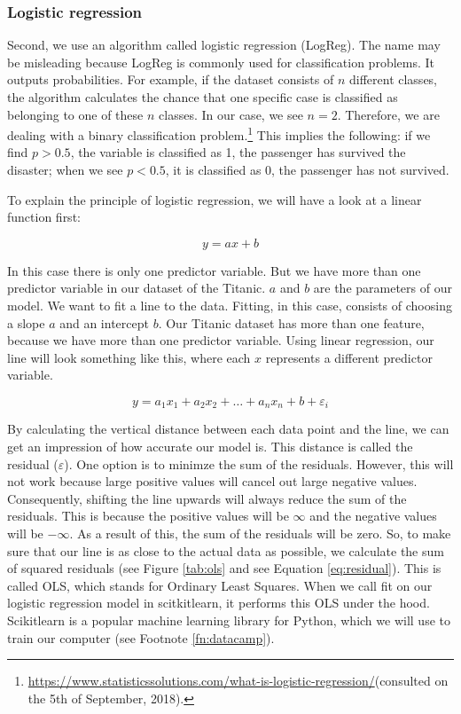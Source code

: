\documentclass[11pt]{article}
\begin{document}
\subsubsection{Logistic regression}
\label{sec:org6cf431b}
Second, we use an algorithm called logistic regression (LogReg). The name may be misleading because LogReg is commonly used for classification problems. It outputs probabilities. For example, if the dataset consists of \(n\) different classes, the algorithm calculates the chance that one specific case is classified as belonging to one of these \(n\) classes. In our case, we see \(n=2\). Therefore, we are dealing with a binary classification problem.\footnote{\url{https://www.statisticssolutions.com/what-is-logistic-regression/}(consulted on the 5th of September, 2018).} This implies the following: if we find \(p>0.5\), the variable is classified as 1, the passenger has survived the disaster; when we see \(p<0.5\), it is classified as 0, the passenger has not survived. 

To explain the principle of logistic regression, we will have a look at a linear function first:

\begin{equation}
y=ax+b
\end{equation} 

In this case there is only one predictor variable. But we have more than one predictor variable in our dataset of the Titanic. \(a\) and \(b\) are the parameters of our model. We want to fit a line to the data. Fitting, in this case, consists of choosing a slope \(a\) and an intercept \(b\). Our Titanic dataset has more than one feature, because we have more than one predictor variable. Using linear regression, our line will look something like this, where each \(x\) represents a different predictor variable. 

\begin{equation}
y=a_1x_1+a_2x_2+ \dots + a_nx_n+b+\varepsilon_{i}  
\end{equation}

By calculating the vertical distance between each data point and the line, we can get an impression of how accurate our model is. This distance is called the residual (\(\varepsilon\)). One option is to minimze the sum of the residuals. However, this will not work because large positive values will cancel out large negative values. Consequently, shifting the line upwards will always reduce the sum of the residuals. This is because the positive values will be \(\infty\) and the negative values will be \(-\infty\). As a result of this, the sum of the residuals will be zero. So, to make sure that our line is as close to the actual data as possible, we calculate the sum of squared residuals (see Figure \ref{tab:ols} and see Equation \ref{eq:residual}). This is called OLS, which stands for Ordinary Least Squares. When we call fit on our logistic regression model in scitkitlearn, it performs this OLS under the hood. Scikitlearn is a popular machine learning library for Python, which we will use to train our computer (see Footnote \ref{fn:datacamp}).
\end{document}

